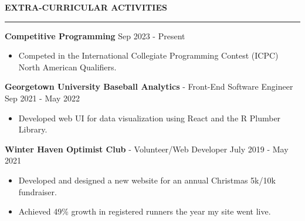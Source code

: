 \documentclass[11pt,letterpaper]{article}
\begin{document}


\medskip
\MakeUppercase{{\bf Extra-Curricular Activities}}
\medskip
\hrule
\begin{list}{}{\setlength{\leftmargin}{0em}}

    \item
    \textbf{Competitive Programming} \hfill Sep 2023 - Present
    \begin{itemize}[topsep=-5pt, noitemsep]
        \item Competed in the International Collegiate Programming Contest (ICPC) North American Qualifiers.
    \end{itemize}
    \item
          \textbf{Georgetown University Baseball Analytics} - Front-End Software Engineer \hfill Sep 2021 - May 2022
          \begin{itemize}[topsep=-5pt, noitemsep]
              \item Developed web UI for data visualization using React and the R Plumber Library.
          \end{itemize}
    \item
          \textbf{Winter Haven Optimist Club} - Volunteer/Web Developer \hfill July 2019 - May 2021
          \begin{itemize}[topsep=-5pt, noitemsep]
              \item Developed and designed a new website for an annual Christmas 5k/10k fundraiser.
              \item Achieved 49\% growth in registered runners the year my site went live.
          \end{itemize}
\end{list}
\end{document}
